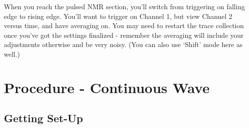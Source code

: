 \documentclass{../lab}
\begin{document}
When you reach the pulsed NMR section, you'll switch from triggering on falling edge to rising edge. You'll want to trigger on Channel 1, but view Channel 2 versus time, and have averaging on. You may need to restart the trace collection once you've got the settings finalized - remember the averaging will include your adjustments otherwise and be very noisy. (You can also use `Shift' mode here as well.)

\section{Procedure - Continuous Wave}

\subsection{Getting Set-Up}
\end{document}
